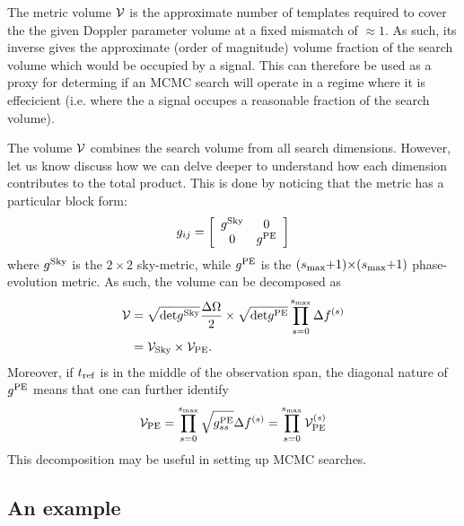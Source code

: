 \documentclass[aps, prd, twocolumn, superscriptaddress, floatfix, showpacs, nofootinbib, longbibliography]{revtex4-1}
\begin{document}
The metric volume $\mathcal{V}$ is the approximate number of templates required to cover
the the given Doppler parameter volume at a fixed mismatch of $\approx 1$. As
such, its inverse gives the approximate (order of magnitude) volume fraction of
the search volume which would be occupied by a signal. This can therefore be
used as a proxy for determing if an MCMC search will operate in a regime where
it is effecicient (i.e. where the a signal occupes a reasonable fraction of the
search volume).

The volume $\mathcal{V}$ combines the search volume from all search dimensions. However,
let us know discuss how we can delve deeper to understand how each dimension
contributes to the total product. This is done by noticing that the metric has
a particular block form:
\begin{align}
g_{ij} = \left[
\begin{array}{cc}
g^{\rm Sky} & 0 \\
0 & g^{\rm PE}
\end{array}
\right]
\end{align}
where $g^{\rm Sky}$ is the $2\times2$ sky-metric, while $g^{\rm PE}$ is the
$(s_{\textrm{max}}{+}1){\times}(s_{\textrm{max}}{+}1)$ phase-evolution metric.
As such, the volume can be decomposed as
\begin{align}
\mathcal{V} & =
\sqrt{\textrm{det}g^{\rm Sky}}\frac{\Delta\Omega}{2} \times
\sqrt{\textrm{det}g^{\rm PE}}\prod_{s=0}^{s_{\textrm{max}}}\Delta f^{(s)} \\
& = \mathcal{V}_{\rm Sky} \times \mathcal{V}_{\rm PE}.
\end{align}
Moreover, if $t_{\rm ref}$ is in the middle of the observation span, the diagonal
nature of $g^{\rm PE}$ means that one can further identify
\begin{align}
\mathcal{V}_{\rm PE} = \prod_{s=0}^{s_{\textrm{max}}}\sqrt{g^{\rm PE}_{ss}} \Delta f^{(s)}
= \prod_{s=0}^{s_{\textrm{max}}}\mathcal{V}_{\rm PE}^{(s)}
\end{align}
This decomposition may be useful in setting up MCMC searches.

\subsection{An example}
\end{document}
